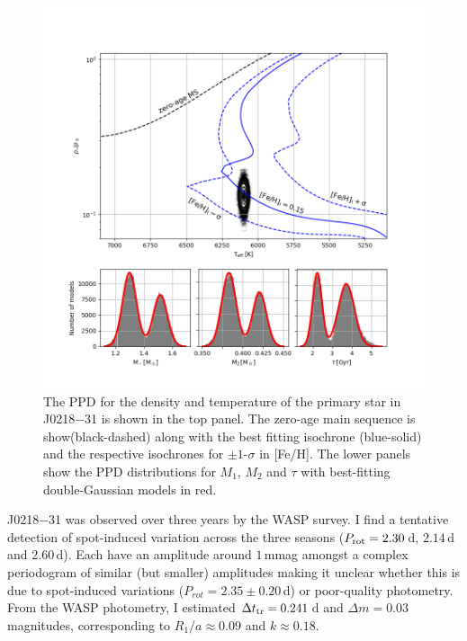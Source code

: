 \begin{figure}
    \centering
    \includegraphics[scale=0.7]{8-Results/J0218-31/HR.png}
    \caption{The PPD for the density and temperature of the primary star in J0218$-$31 is shown in the top panel. The zero-age main sequence is show(black-dashed) along with the best fitting isochrone (blue-solid) and the respective isochrones for $\pm 1$-$\sigma$ in [Fe/H]. The lower panels show the PPD distributions for $M_1$, $M_2$ and $\tau$ with best-fitting double-Gaussian models in red. }
    \label{fig:my_label}
\end{figure}

J0218$-$31 was observed over three years by the WASP survey. I find a tentative detection of spot-induced variation across the three seasons ($P_{\rm rot}=2.30$\,d, $2.14$\,d and $2.60$\,d). Each have an amplitude around $1$\,mmag amongst a complex periodogram of similar (but smaller) amplitudes making it unclear whether this is due to spot-induced variations ($P_{rot} = 2.35 \pm 0.20$\,d) or poor-quality photometry. From the WASP photometry, I estimated $\Delta t_{\rm tr}= 0.241$\,d and $\Delta m = 0.03$\,magnitudes, corresponding to $R_{1}/a  \approx 0.09$ and $k \approx 0.18$.

